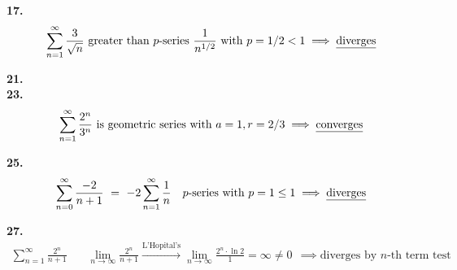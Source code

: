\documentclass{article}
\begin{document}
\noindent
\textbf{
17.
}
\\
\begin{gather*}
\sum_{n=1}^{\infty} \frac{3}{\sqrt{n}} \text{ greater than $p$-series } \frac{1}{n^{1/2}}
\text{ with } p=1/2<1
\implies \text{\underline{diverges}}
\\
\end{gather*}

\noindent
\textbf{
21.
}
\\

\noindent
\textbf{
23.
}
\\
\begin{gather*}
\sum_{n=1}^{\infty} \frac{2^n}{3^n} \text{ is geometric series with }
a=1, r=2/3
\implies \text{\underline{converges}}
\\
\end{gather*}

\noindent
\textbf{
25.
}
\\
\begin{gather*}
\sum_{n=0}^{\infty} \frac{-2}{n+1}
~=~
-2 \sum_{n=1}^{\infty} \frac{1}{n}
~~
\text{ $p$-series with } p=1\leq 1
\implies \text{\underline{diverges}}
\\
\end{gather*}

\noindent
\textbf{
27.
}
\\
\begin{gather*}
\sum_{n=1}^{\infty} \frac{2^n}{n+1}
~~~~~~~~
\lim_{n \to \infty} \frac{2^n}{n+1}
\xrightarrow{\text{L'Hopital's}}
\lim_{n \to \infty} \frac{2^n \cdot \ln 2}{1}=\infty \neq 0
~~\implies
\text{diverges by $n$-th term test}
\\
\end{gather*}
\end{document}
